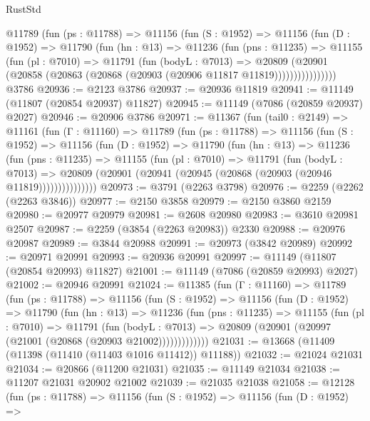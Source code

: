 \begin{lexlean}{RustStd}
\begin{coremodule}
        @11789
          (fun (ps : @11788) =>
          @11156
            (fun (S : @1952) =>
            @11156
              (fun (D : @1952) =>
              @11790
                (fun (hn : @13) =>
                @11236
                  (fun (pns : @11235) =>
                  @11155
                    (fun (pl : @7010) =>
                    @11791
                      (fun (bodyL : @7013) =>
                      @20809
                        (@20901
                          (@20858 (@20863 (@20868 (@20903 (@20906 @11817 @11819))))))))))))))))
    @3786
@20936 := @2123 @3786
@20937 := @20936 @11819
@20941 := @11149 (@11807 (@20854 @20937) @11827)
@20945 := @11149 (@7086 (@20859 @20937) @2027)
@20946 := @20906 @3786
@20971 := @11367
    (fun (tail0 : @2149) =>
    @11161
      (fun (Γ : @11160) =>
      @11789
        (fun (ps : @11788) =>
        @11156
          (fun (S : @1952) =>
          @11156
            (fun (D : @1952) =>
            @11790
              (fun (hn : @13) =>
              @11236
                (fun (pns : @11235) =>
                @11155
                  (fun (pl : @7010) =>
                  @11791
                    (fun (bodyL : @7013) =>
                    @20809 (@20901 (@20941 (@20945 (@20868 (@20903 (@20946 @11819)))))))))))))))
@20973 := @3791 (@2263 @3798)
@20976 := @2259 (@2262 (@2263 @3846))
@20977 := @2150 @3858
@20979 := @2150 @3860 @2159
@20980 := @20977 @20979
@20981 := @2608 @20980
@20983 := @3610 @20981 @2507
@20987 := @2259 (@3854 (@2263 @20983)) @2330
@20988 := @20976 @20987
@20989 := @3844 @20988
@20991 := @20973 (@3842 @20989)
@20992 := @20971 @20991
@20993 := @20936 @20991
@20997 := @11149 (@11807 (@20854 @20993) @11827)
@21001 := @11149 (@7086 (@20859 @20993) @2027)
@21002 := @20946 @20991
@21024 := @11385
    (fun (Γ : @11160) =>
    @11789
      (fun (ps : @11788) =>
      @11156
        (fun (S : @1952) =>
        @11156
          (fun (D : @1952) =>
          @11790
            (fun (hn : @13) =>
            @11236
              (fun (pns : @11235) =>
              @11155
                (fun (pl : @7010) =>
                @11791
                  (fun (bodyL : @7013) =>
                  @20809 (@20901 (@20997 (@21001 (@20868 (@20903 @21002)))))))))))))
@21031 := @13668 (@11409 (@11398 (@11410 (@11403 @1016 @11412)) @11188))
@21032 := @21024 @21031
@21034 := @20866 (@11200 @21031)
@21035 := @11149 @21034
@21038 := @11207 @21031 @20902 @21002
@21039 := @21035 @21038
@21058 := @12128
    (fun (ps : @11788) =>
    @11156
      (fun (S : @1952) =>
      @11156
        (fun (D : @1952) =>

\end{coremodule}
\end{lexlean}

